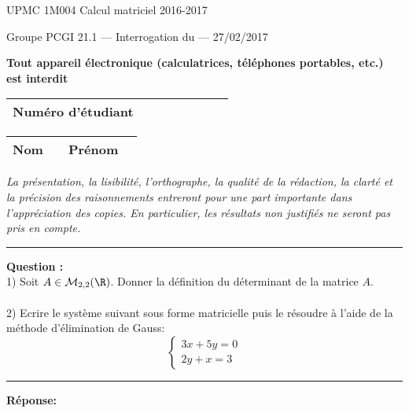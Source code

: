 \documentclass[11pt]{article}
\begin{document}
{\large UPMC \hfill 1M004 Calcul matriciel \hfill 2016-2017}

\vskip -3mm
\noindent \textbf{\hrulefill}

\vskip 1mm

\centerline{
{\large Groupe PCGI 21.1 \hspace{1.7 cm} --- Interrogation du --- \hspace{3.5 cm}  27/02/2017}}


\vskip -2mm
\noindent \textbf{\hrulefill}



\vskip 2mm

\centerline{\textbf{Tout appareil \'electronique (calculatrices, t\'el\'ephones portables, etc.) est interdit}}

\vskip 2mm
{\LARGE
\begin{center}
\begin{tabular}{|p{7cm}|p{1cm}|p{1cm}|p{1cm}|p{1cm}|p{1cm}|p{1cm}|p{1cm}|}
\hline
\textbf{Num\'ero d'\'etudiant} &     & & & & &   &
\\
\hline
\end{tabular}

\vskip 0.25cm

\begin{tabular}{|p{2cm}|p{6cm}|p{3cm}|p{5cm}|}
\hline
\textbf{Nom} &     & \textbf{Pr\'enom   }  &   \\
\hline
\end{tabular}
\end{center}
} %


{\sl  La pr\'esentation, la lisibilit\'e, l'orthographe, la
 qualit\'e de la r\'edaction, la clart\'e et la pr\'ecision des
 raisonnements entreront pour une part importante dans
 l'appr\'eciation des copies. En particulier, les r\'esultats non
 justifi\'es ne seront pas pris en compte. }


\vskip 3mm
\hrule

\vskip 3mm
\noindent \textbf{Question :}\\
1) Soit $A \in \mathcal{M}_{2,2}(\R)$. Donner la définition du déterminant de la matrice  $A$.\\\\
2) Ecrire le système suivant sous forme matricielle puis le résoudre à l'aide de la méthode d'élimination de Gauss:
\begin{equation*}
\left\lbrace\begin{array}{llccc}
3x + 5 y = 0 \\
2y + x = 3
\end{array}
\right.
\end{equation*}


\kern\medskipamount

\hrule

\vskip 3mm


\noindent \textbf{Réponse:}\\

\newpage
\end{document}
